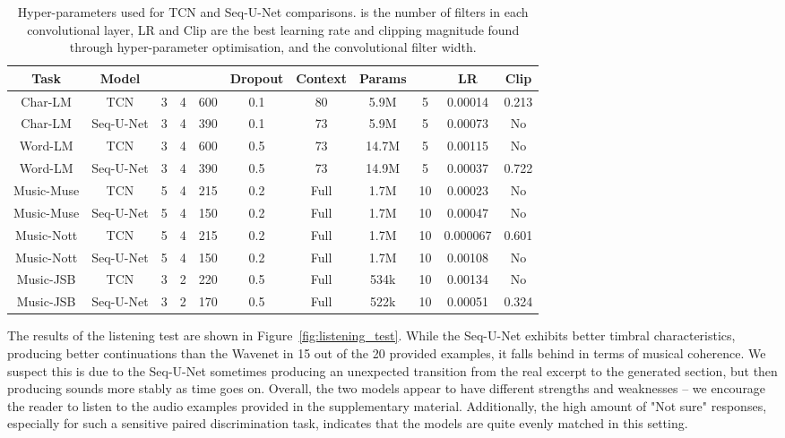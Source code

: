 \documentclass{article}
\begin{document}
\begin{table*}[t]
\centering
\begin{tabular}{ccccccccccc}
\toprule
Task & Model &  &  &  & Dropout & Context & Params &  & LR & Clip \\
\midrule
Char-LM & TCN & 3 & 4 & 600 & 0.1 & 80 & 5.9M & 5 & 0.00014 & 0.213 \\
Char-LM & Seq-U-Net & 3 & 4 & 390 & 0.1 & 73 & 5.9M & 5 & 0.00073 & No \\
\midrule
Word-LM & TCN & 3 & 4 & 600 & 0.5 & 73 & 14.7M & 5 & 0.00115 & No \\
Word-LM & Seq-U-Net & 3 & 4 & 390 & 0.5 & 73 & 14.9M & 5 & 0.00037 & 0.722 \\
\midrule
Music-Muse & TCN & 5 & 4 & 215 & 0.2 & Full & 1.7M & 10 & 0.00023 & No \\
Music-Muse & Seq-U-Net & 5 & 4 & 150 & 0.2 & Full & 1.7M & 10 & 0.00047 & No \\
\midrule
Music-Nott & TCN & 5 & 4 & 215 & 0.2 & Full & 1.7M & 10 & 0.000067 & 0.601 \\
Music-Nott & Seq-U-Net & 5 & 4 & 150 & 0.2 & Full & 1.7M & 10 & 0.00108 & No \\
\midrule
Music-JSB & TCN & 3 & 2 & 220 & 0.5 & Full & 534k & 10 & 0.00134 & No \\
Music-JSB & Seq-U-Net & 3 & 2 & 170 & 0.5 & Full & 522k & 10 & 0.00051 & 0.324 \\
\bottomrule
\end{tabular}
\caption{Hyper-parameters used for TCN and Seq-U-Net comparisons.  is the number of filters in each convolutional layer, LR and Clip are the best learning rate and clipping magnitude found through hyper-parameter optimisation, and  the convolutional filter width.}
\label{tab:hyperparams}
\end{table*}

The results of the listening test are shown in Figure~\ref{fig:listening_test}.
While the Seq-U-Net exhibits better timbral characteristics, producing better continuations than the Wavenet in 15 out of the 20 provided examples, it falls behind in terms of musical coherence.
We suspect this is due to the Seq-U-Net sometimes producing an unexpected transition from the real excerpt to the generated section, but then producing sounds more stably as time goes on.
Overall, the two models appear to have different strengths and weaknesses -- we encourage the reader to listen to the audio examples provided in the supplementary material.
Additionally, the high amount of "Not sure" responses, especially for such a sensitive paired discrimination task, indicates that the models are quite evenly matched in this setting.
\end{document}
